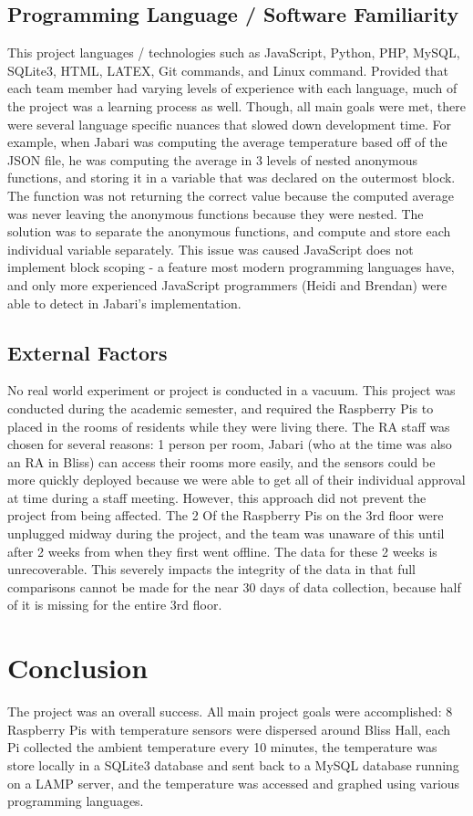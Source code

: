 \documentclass{article}
\begin{document}
		\subsection{Programming Language / Software Familiarity}
			This project languages / technologies such as JavaScript, Python, PHP, MySQL, SQLite3, HTML, LATEX, Git commands, and Linux command. Provided
			that each team member had varying levels of experience with each language, much of the project was a learning process as well. Though, all main 
			goals were met, there were several language specific nuances that slowed down development time. For example, when Jabari was computing the average
			temperature based off of the JSON file, he was computing the average in 3 levels of nested anonymous functions, and storing it in a variable 
			that was declared on the outermost block. The function was not returning the correct value because the computed average was never leaving the 
			anonymous functions because they were nested. The solution was to separate the anonymous functions, and compute and store each individual variable 
			separately. This issue was caused JavaScript does not implement block scoping - a feature most modern programming languages have, and only more
			experienced JavaScript programmers (Heidi and Brendan) were able to detect in Jabari's implementation.
		
		\subsection{External Factors}
			No real world experiment or project is conducted in a vacuum. This project was conducted during the academic semester, and required the 
			Raspberry Pis to placed in the rooms of residents while they were living there. The RA staff was chosen for several reasons: 1 person per room,
			Jabari (who at the time was also an RA in Bliss) can access their rooms more easily, and the sensors could be more quickly deployed because
			we were able to get all of their individual approval at time during a staff meeting. However, this approach did not prevent the project from
			being affected. The 2 Of the Raspberry Pis on the 3rd floor were unplugged midway during the project, and the team was unaware of this until after 
			2 weeks from when they first went offline. The data for these 2 weeks is unrecoverable. This severely impacts the integrity of the data in 
			that full comparisons cannot be made for the near 30 days of data collection, because half of it is missing for the entire 3rd floor. 
			
	\section{Conclusion}\label{sec:conclusion}
		The project was an overall success. All main project goals were accomplished: 8 Raspberry Pis with temperature sensors were dispersed
		around Bliss Hall, each Pi collected the ambient temperature every 10 minutes, the temperature was store locally in a SQLite3 database
		and sent back to a MySQL database running on a LAMP server, and the temperature was accessed and graphed using various programming languages.
\end{document}
